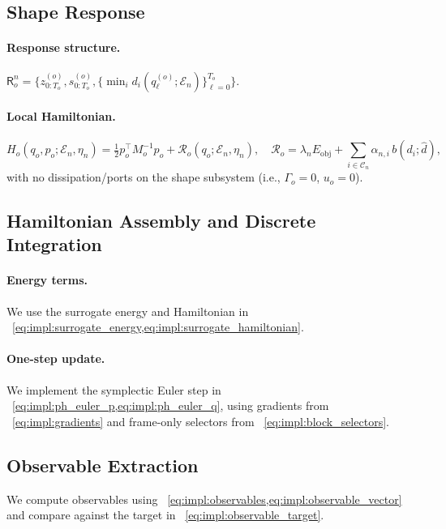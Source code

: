\subsection{Shape Response}
\label{subsec:shape_response}

\paragraph{Response structure.}
$\mathsf{R}_o^n=\{z_{0:T_o}^{(o)},s_{0:T_o}^{(o)},\{\min_i d_i(q_\ell^{(o)};\mathcal{E}_n)\}_{\ell=0}^{T_o}\}$.

\paragraph{Local Hamiltonian.}
\[
H_o(q_o,p_o;\mathcal{E}_n,\eta_n)
=\tfrac12 p_o^\top M_o^{-1}p_o+\mathcal{R}_o(q_o;\mathcal{E}_n,\eta_n),
\quad
\mathcal{R}_o=\lambda_n E_{\mathrm{obj}}+\sum_{i\in\mathcal{C}_n}\alpha_{n,i}\,b(d_i;\hat d),
\]
with no dissipation/ports on the shape subsystem (i.e., $\Gamma_o=0$, $u_o=0$).

\subsection{Hamiltonian Assembly and Discrete Integration}
\label{subsec:symplectic_integration}

\paragraph{Energy terms.}
We use the surrogate energy and Hamiltonian in ~\cref{eq:impl:surrogate_energy,eq:impl:surrogate_hamiltonian}.

\paragraph{One-step update.}
We implement the symplectic Euler step in ~\cref{eq:impl:ph_euler_p,eq:impl:ph_euler_q}, using gradients from
~\cref{eq:impl:gradients} and frame-only selectors from ~\cref{eq:impl:block_selectors}.

\subsection{Observable Extraction}
\label{subsec:observable_extraction}

We compute observables using ~\cref{eq:impl:observables,eq:impl:observable_vector} and compare against the target
in ~\cref{eq:impl:observable_target}.

